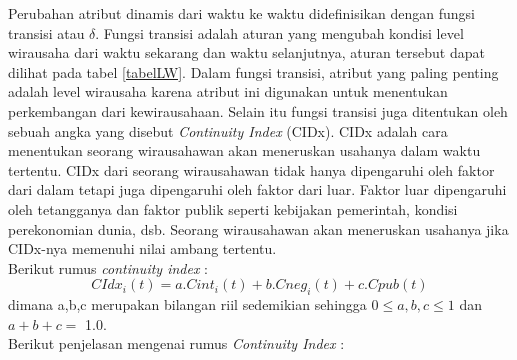 Perubahan atribut dinamis dari waktu ke waktu didefinisikan dengan fungsi transisi atau $\delta$. Fungsi transisi adalah aturan yang mengubah kondisi level wirausaha dari waktu sekarang dan waktu selanjutnya, aturan tersebut dapat dilihat pada tabel \ref{tabelLW}. Dalam fungsi transisi, atribut yang paling penting adalah level wirausaha karena atribut ini digunakan untuk menentukan perkembangan dari kewirausahaan. Selain itu fungsi transisi juga ditentukan oleh sebuah angka yang disebut \textit{Continuity Index} (CIDx). CIDx adalah cara menentukan seorang wirausahawan akan meneruskan usahanya dalam waktu tertentu. CIDx dari seorang wirausahawan tidak hanya dipengaruhi oleh faktor dari dalam tetapi juga dipengaruhi oleh faktor dari luar. Faktor luar dipengaruhi oleh tetangganya dan faktor publik seperti kebijakan pemerintah, kondisi perekonomian dunia, dsb. Seorang wirausahawan akan meneruskan usahanya jika CIDx-nya memenuhi nilai ambang tertentu.\\
Berikut rumus \textit{continuity index} :
\begin{displaymath}
\label{RumusCIDx}
	CIdx_{i}(t) = a.Cint_{i}(t) + b.Cneg_{i}(t) + c.Cpub(t)
\end{displaymath}
dimana a,b,c merupakan bilangan riil sedemikian sehingga $0\leq a,b,c \leq 1$ dan $a+b+c=$ 1.0.\\
Berikut penjelasan mengenai rumus \textit{Continuity Index} :
